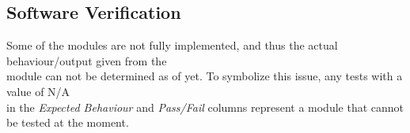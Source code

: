 \documentclass [10pt]{article}
\begin{document}

    
     
    
    
    
     


\subsection {Software Verification}  

Some of the modules are not fully implemented, and thus the actual behaviour/output given from the \\
module can not be determined as of yet. To symbolize this issue, any tests with a value of N/A \\
in the \textit{Expected Behaviour} and \textit{Pass/Fail} columns represent a module that cannot be tested at the moment. \\
\end{document}
